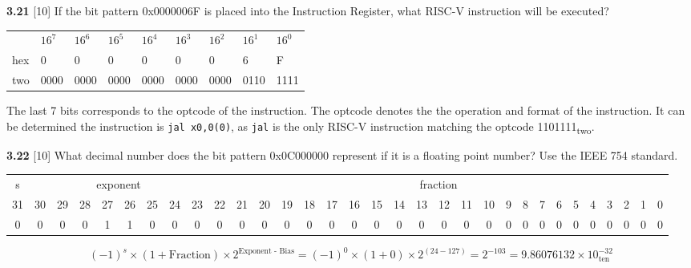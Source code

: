 \documentclass[fleqn]{article}
\begin{document}
\vspace{0.5in}
\textbf{3.21} [10] \textrangle \; If the bit pattern 0x0000006F is placed into the Instruction Register, what RISC-V instruction will be executed?
\begin{addmargin}[0.15cm]{0cm}
\begin{table}[H]
    \begin{tabular}{l|llllllll}
        & $16^7$ & $16^6$ & $16^5$ & $16^4$ & $16^3$ & $16^2$ & $16^1$ & $16^0$ \\ 
        hex & 0 & 0 & 0 & 0 & 0 & 0 & 6 & F \\
        two & 0000 & 0000 & 0000 & 0000 & 0000 & 0000 & 0110 & 1111
    \end{tabular}
\end{table}
The last 7 bits corresponds to the optcode of the instruction. The optcode denotes the the operation and format of the instruction. It can be determined the instruction is \verb|jal x0,0(0)|, as \verb|jal| is the only RISC-V instruction matching the optcode 1101111\textsubscript{two}.

\end{addmargin}

\vspace{0.5in}
\textbf{3.22} [10] \textrangle \; What decimal number does the bit pattern 0x0C000000 represent if it is a floating point number? Use the IEEE 754 standard.
\begin{addmargin}[0.15cm]{0cm}
\begin{table}[H]
    \setlength{\tabcolsep}{4pt}
    \fontsize{7pt}{8pt}\selectfont
    \begin{tabular}{c|cccccccc|ccccccccccccccccccccccc}
        s & \multicolumn{8}{c|}{exponent} & \multicolumn{23}{c}{fraction} \\
        31 & 30 & 29 & 28 & 27 & 26 & 25 & 24 & 23 & 22 & 21 & 20 & 19 & 18 & 17 & 16 & 15 & 14 & 13 & 12 & 11 & 10 & 9 & 8 & 7 & 6 & 5 & 4 & 3 & 2 & 1 & 0 \\
        0 & 0 & 0 & 0 & 1 & 1 & 0 & 0 & 0 & 0 & 0 & 0 & 0 & 0 & 0 & 0 & 0 & 0 & 0 & 0 & 0 & 0 & 0 & 0 & 0 & 0 & 0 & 0 & 0 & 0 & 0 & 0
    \end{tabular}
\end{table}
\[ (-1)^s \times (1 + \text{Fraction}) \times  2^{\text{Exponent - Bias}} = (-1)^0 \times (1 + 0) \times 2^{(24 - 127)} = 2^{-103} = 9.86076132 \times 10^{-32}_{\text{ten}}\]
\end{addmargin}
\end{document}
